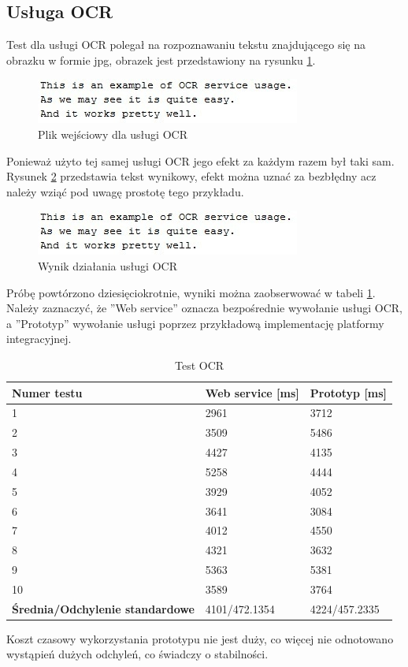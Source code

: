 \subsection{Usługa OCR}
Test dla usługi OCR polegał na rozpoznawaniu tekstu znajdującego się na obrazku w formie jpg, obrazek jest przedstawiony na rysunku \ref{fig:OCRExample}. 
\begin{figure}[!h]
\centering
\includegraphics[scale=0.9]{OCRExample.jpg}
\caption{Plik wejściowy dla usługi OCR}\label{fig:OCRExample}
\end{figure}
Ponieważ użyto tej samej usługi OCR jego efekt za każdym razem był taki sam. Rysunek \ref{fig:OCRResult} przedstawia tekst wynikowy, efekt można uznać za bezbłędny acz należy wziąć pod uwagę prostotę tego przykładu.
\begin{figure}[!h]
\centering
\includegraphics[scale=0.9]{OCRExample.jpg}
\caption{Wynik działania usługi OCR}\label{fig:OCRResult}
\end{figure}

Próbę powtórzono dziesięciokrotnie, wyniki można zaobserwować w tabeli \ref{tab:ocr}. Należy zaznaczyć, że ''Web service'' oznacza bezpośrednie wywołanie usługi OCR, a ''Prototyp'' wywołanie usługi poprzez przykładową implementację platformy integracyjnej.
\newpage
\begin{center}
	\begin{table}[h]
	\centering
	\begin{tabular}{| l | l | l |}	
		\hline
		\textbf{Numer testu} & \textbf{Web service [ms]} & \textbf{Prototyp [ms]} \\ \hline
		1 & 2961 & 3712\\ \hline
		2 & 3509 & 5486\\ \hline
		3 & 4427 & 4135\\ \hline
		4 & 5258 & 4444\\ \hline
		5 & 3929 & 4052\\ \hline
		6 & 3641 & 3084\\ \hline
		7 & 4012 & 4550\\ \hline
		8 & 4321 & 3632\\ \hline
		9 & 5363 & 5381\\ \hline
		10 & 3589 & 3764\\ \hline
		\textbf{Średnia/Odchylenie standardowe} & 4101/472.1354 & 4224/457.2335\\ 
		\hline
	\end{tabular}
	\caption{Test OCR}
	\label{tab:ocr}
	\end{table}
\end{center}
Koszt czasowy wykorzystania prototypu nie jest duży, co więcej nie odnotowano wystąpień dużych odchyleń, co świadczy o stabilności. 

